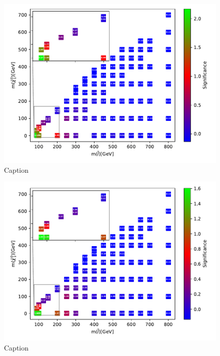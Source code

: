 \begin{figure}
    \centering
    \includegraphics[width = \textwidth]{Figures/Significances/significance_BDT_slepslep_Low_level.pdf}
    \caption{Caption}
    \label{fig:my_label}
\end{figure}


\begin{figure}
    \centering
    \includegraphics[width = \textwidth]{Figures/Significances/significance_BDT_slepslep_High_level.pdf}
    \caption{Caption}
    \label{fig:my_label}
\end{figure}



